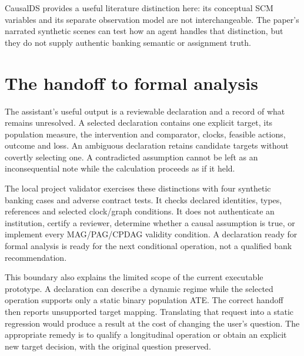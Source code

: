 CausalDS provides a useful literature distinction here: its conceptual SCM
variables and its separate observation model are not interchangeable. The
paper's narrated synthetic scenes can test how an agent handles that
distinction, but they do not supply authentic banking semantic or assignment
truth.\cite{v12_la_2607_08093}

\section{The handoff to formal analysis}

The assistant's useful output is a reviewable declaration and a record of
what remains unresolved. A selected declaration contains one explicit target,
its population measure, the intervention and comparator, clocks, feasible
actions, outcome and loss. An ambiguous declaration retains candidate targets
without covertly selecting one. A contradicted assumption cannot be left as
an inconsequential note while the calculation proceeds as if it held.

The local project validator exercises these distinctions with four synthetic
banking cases and adverse contract tests. It checks declared identities,
types, references and selected clock/graph conditions. It does not authenticate
an institution, certify a reviewer, determine whether a causal assumption is
true, or implement every MAG/PAG/CPDAG validity condition. A declaration ready
for formal analysis is ready for the next conditional operation, not a
qualified bank recommendation.

This boundary also explains the limited scope of the current executable
prototype. A declaration can describe a dynamic regime while the selected
operation supports only a static binary population ATE. The correct handoff
then reports unsupported target mapping. Translating that request into a
static regression would produce a result at the cost of changing the user's
question. The appropriate remedy is to qualify a longitudinal operation or
obtain an explicit new target decision, with the original question preserved.
